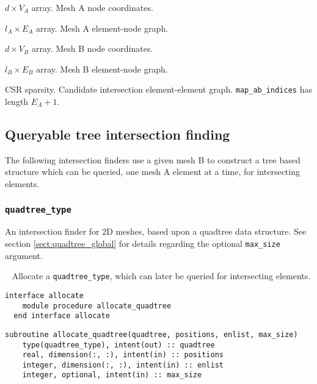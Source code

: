 \documentclass{article}
\begin{document}
\begin{description}[font=\ttfamily\bfseries,leftmargin=2.2\parindent,labelindent=1.7\parindent,noitemsep]
  \item[positions\_a] $d \times V_A$ array. Mesh A node coordinates.
  \item[enlist\_a] $l_A \times E_A$ array. Mesh A element-node graph.
  \item[positions\_b] $d \times V_B$ array. Mesh B node coordinates.
  \item[enlist\_b] $l_B \times E_B$ array. Mesh B element-node graph.
  \item[map\_ab\_indices, map\_ab\_indptr] CSR sparsity. Candidate intersection
    element-element graph. \linebreak \verb+map_ab_indices+ has length
    $E_A + 1$.
\end{description}

\subsection{Queryable tree intersection finding}

The following intersection finders use a given mesh B to construct a tree based
structure which can be queried, one mesh A element at a time, for intersecting
elements.

\subsubsection{\texttt{quadtree\_type}}\label{sect:quadtree_query}
  
An intersection finder for 2D meshes, based upon a quadtree data structure. See
section \ref{sect:quadtree_global} for details regarding the optional
\verb+max_size+ argument.

~\newline
Allocate a \verb+quadtree_type+, which can later be queried for intersecting
elements.

\begin{lstlisting}[language=FORTRAN]
  interface allocate
    module procedure allocate_quadtree
  end interface allocate
\end{lstlisting}
  
\begin{lstlisting}[language=FORTRAN]
  subroutine allocate_quadtree(quadtree, positions, enlist, max_size)
    type(quadtree_type), intent(out) :: quadtree
    real, dimension(:, :), intent(in) :: positions
    integer, dimension(:, :), intent(in) :: enlist
    integer, optional, intent(in) :: max_size 
\end{lstlisting}
\end{document}
